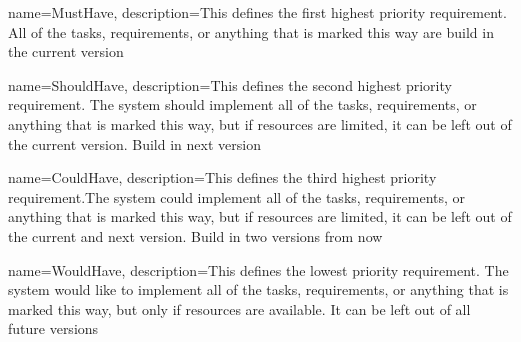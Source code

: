 {	name={MustHave},
	description={This defines the first highest priority requirement.
	All of the tasks, requirements, or anything that is marked this way are
	build in the current version}
}

{	name={ShouldHave},
	description={This defines the second highest priority requirement. The system should implement 
	all of the tasks, requirements, or anything that is marked this way, but if 
	resources are limited, it can be left out of the current version.
	Build in next version}
}

{	name={CouldHave},
	description={This defines the third highest priority requirement.The system could implement 
	all of the tasks, requirements, or anything that is marked this way, but if 
	resources are limited, it can be left out of the current and next version.
	Build in two versions from now}
}

{	name={WouldHave},
	description={This defines the lowest priority requirement.  The system would like to implement 
all of the tasks, requirements, or anything that is marked this way, but only
if resources are available. It can be left out of all future versions}
}

